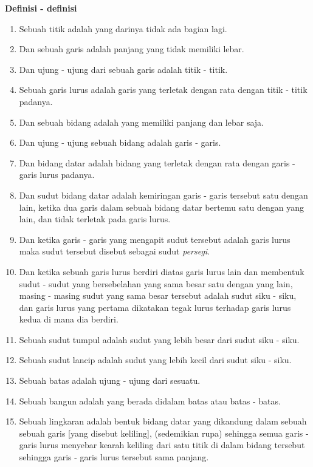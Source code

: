 \documentclass[a4paper]{book}
\begin{document}
\begin{center}
\textbf{Definisi - definisi}
\end{center} 
\begin{enumerate}
\item Sebuah titik adalah yang darinya tidak ada bagian lagi.
\item Dan sebuah garis adalah panjang yang tidak memiliki lebar.
\item Dan ujung - ujung dari sebuah garis adalah titik - titik.
\item Sebuah garis lurus adalah garis yang terletak dengan rata dengan titik - titik padanya.
\item Dan sebuah bidang adalah yang memiliki panjang dan lebar saja.
\item Dan ujung - ujung sebuah bidang adalah garis - garis.
\item Dan bidang datar adalah bidang yang terletak dengan rata dengan garis - garis lurus padanya.
\item Dan sudut bidang datar adalah kemiringan garis - garis tersebut 
satu dengan lain, ketika dua garis dalam sebuah bidang datar bertemu satu dengan
yang lain, dan tidak terletak pada garis lurus.
\item Dan ketika garis - garis yang mengapit sudut tersebut adalah garis lurus maka sudut
tersebut disebut sebagai sudut \textit{persegi}.
\item Dan ketika sebuah garis lurus berdiri diatas garis lurus lain dan 
membentuk sudut - sudut yang bersebelahan yang sama besar satu dengan yang 
lain, masing - masing sudut yang sama besar tersebut adalah sudut siku - siku,
dan garis lurus yang pertama dikatakan tegak lurus terhadap garis lurus kedua
di mana dia berdiri.
\item Sebuah sudut tumpul adalah sudut yang lebih besar dari sudut siku - siku.
\item Sebuah sudut lancip adalah sudut yang lebih kecil dari sudut siku - siku.
\item Sebuah batas adalah ujung - ujung dari sesuatu.
\item Sebuah bangun adalah yang berada didalam batas atau batas - batas.
\item Sebuah lingkaran adalah bentuk bidang datar yang dikandung dalam sebuah 
sebuah garis [yang disebut keliling], (sedemikian rupa) sehingga semua 
garis - garis lurus menyebar kearah keliling dari satu titik di dalam bidang
tersebut sehingga garis - garis lurus tersebut sama panjang.

\end{enumerate}
\end{document}
